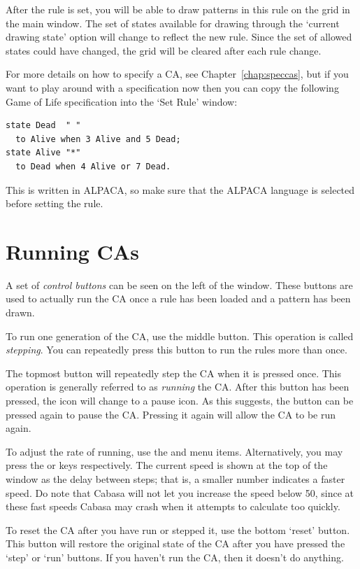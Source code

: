 \documentclass[oneside,a4paper]{memoir}
\begin{document}
After the rule is set, you will be able to draw patterns in this rule on the grid in the main window.
The set of states available for drawing through the `current drawing state' option will change to reflect the new rule.
Since the set of allowed states could have changed, the grid will be cleared after each rule change.

For more details on how to specify a CA, see Chapter~\ref{chap:speccas},
  but if you want to play around with a specification now then you can copy the following Game of Life specification into the `Set Rule' window:

\begin{verbatim}
state Dead  " "
  to Alive when 3 Alive and 5 Dead;
state Alive "*"
  to Dead when 4 Alive or 7 Dead.
\end{verbatim}

This is written in ALPACA, so make sure that the ALPACA language is selected before setting the rule.

\section{Running CAs}
\label{sec:running}

A set of \emph{control buttons} can be seen on the left of the window.
These buttons are used to actually run the CA once a rule has been loaded and a pattern has been drawn.

To run one generation of the CA, use the middle button.
This operation is called \emph{stepping}.
You can repeatedly press this button to run the rules more than once.

The topmost button will repeatedly step the CA when it is pressed once.
This operation is generally referred to as \emph{running} the CA.
After this button has been pressed, the icon will change to a pause icon.
As this suggests, the button can be pressed again to pause the CA.
Pressing it again will allow the CA to be run again.

To adjust the rate of running, use the  and  menu items.
Alternatively, you may press the \keys{{+}} or \keys{-} keys respectively.
The current speed is shown at the top of the window as the delay between steps;
  that is, a smaller number indicates a faster speed.
Do note that Cabasa will not let you increase the speed below 50,
  since at these fast speeds Cabasa may crash when it attempts to calculate too quickly.

To reset the CA after you have run or stepped it, use the bottom `reset' button.
This button will restore the original state of the CA after you have pressed the `step' or `run' buttons.
If you haven't run the CA, then it doesn't do anything.
\end{document}
